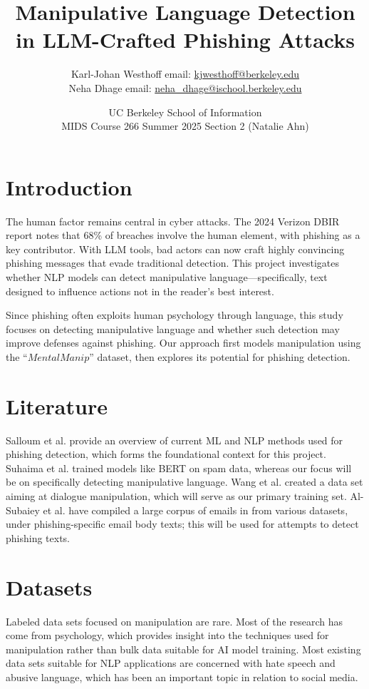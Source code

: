 \documentclass[
	letterpaper, %
	12pt, %
	unnumberedsections, %
	twoside, %
]{LTJournalArticle}
\title{Manipulative Language Detection in LLM-Crafted
Phishing Attacks
}  %
\author{\small
	Karl-Johan Westhoff 
	email: \href{mailto:kjwesthoff@berkeley.edu}{kjwesthoff@berkeley.edu} \\ 
    \small Neha Dhage 
	email: \href{mailto:neha_dhage@ischool.berkeley.edu}{neha\_dhage@ischool.berkeley.edu}
}
\date{\small UC Berkeley School of Information \\
MIDS Course 266 Summer 2025 Section 2 (Natalie Ahn) \\
}
\begin{document}
\maketitle %
\section{Introduction}
The human factor remains central in cyber attacks. The 2024 Verizon DBIR report \cite{verizon2024dbir} notes that 68\% of breaches involve the human element, with phishing as a key contributor. With LLM tools, bad actors can now craft highly convincing phishing messages that evade traditional detection.
This project investigates whether NLP models can detect manipulative language—specifically, text designed to influence actions not in the reader's best interest.

Since phishing often exploits human psychology through language, this study focuses on detecting manipulative language and whether such detection may improve defenses against phishing. Our approach first models manipulation using the “$MentalManip$” dataset, then explores its potential for phishing detection.

\section{Literature}
Salloum et al. \cite{SALLOUM202119} provide an overview of current ML and NLP methods used for phishing detection, which forms the foundational context for this project.
Suhaima et al. \cite{ImprovedPhishing} trained models like BERT on spam data, whereas our focus will be on specifically detecting manipulative language.
Wang et al. \cite{MentalManip} created a data set aiming at dialogue manipulation, which will serve as our primary training set.
Al-Subaiey et al. have compiled a large corpus of emails in \cite{PhishingEmailDataset} from various datasets, under phishing-specific email body texts; this will be used for attempts to detect phishing texts.

\section{Datasets}
Labeled data sets focused on manipulation are rare. Most of the research has come from psychology, which provides insight into the techniques used for manipulation rather than bulk data suitable for AI model training. Most existing data sets suitable for NLP applications are concerned with hate speech and abusive language, which has been an important topic in relation to social media.
\end{document}
